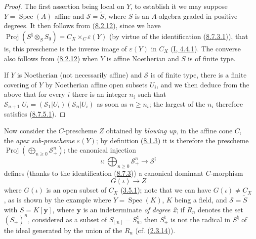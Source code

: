 \begin{proof}
The first assertion being local on $Y$, to establish it we may suppose
$Y=\operatorname{Spec}(A)$ affine and $\mathcal{S}=\widetilde{S}$, where $S$ is
an $A$-algebra graded in positive degrees. It then follows from
(\hyperref[II.8.2.12]{8.2.12}), since we have
$\operatorname{Proj}(S^{\natural}\otimes_S S_0)=
C_X\times_C\varepsilon(Y)$ (by virtue of the identification
(\hyperref[II.8.7.3.1]{8.7.3.1})), that is, this prescheme is the
inverse image of $\varepsilon(Y)$ in $C_X$
(\hyperref[I.4.4.1]{I, 4.4.1}). The converse also follows from
(\hyperref[II.8.2.12]{8.2.12}) when $Y$ is affine Noetherian and $S$ is of
finite type.

If $Y$ is Noetherian (not necessarily affine) and $\mathcal{S}$ is of finite
type, there is a finite covering of $Y$ by Noetherian affine open subsets
$U_i$, and we then deduce from the above that for every $i$ there is an
integer $n_i$ such that
$\mathcal{S}_{n+1}|U_i=(\mathcal{S}_1|U_i)(\mathcal{S}_n|U_i)$ as soon as
$n\geqslant n_i$; the largest of the $n_i$ therefore satisfies
(\hyperref[II.8.7.5.1]{8.7.5.1}).
\end{proof}

\begin{env}[8.7.6]
\label{II.8.7.6}
Now consider the $C$-prescheme $Z$ obtained by \emph{blowing up}, in the
affine cone $C$, the \emph{apex sub-prescheme} $\varepsilon(Y)$; by
definition (\hyperref[II.8.1.3]{8.1.3}) it is therefore the prescheme
$\operatorname{Proj}(\bigoplus_{n\geqslant 0}\mathcal{S}_+^n)$; the canonical
injection
\begin{equation}
\label{II.8.7.6.1}
  \iota:\bigoplus_{n\geqslant 0}\mathcal{S}_+^n
  \longrightarrow\mathcal{S}^{\natural}
\tag{8.7.6.1}
\end{equation}
defines (thanks to the identification (\hyperref[II.8.7.3]{8.7.3})) a
canonical dominant $C$-morphism
\begin{equation}
\label{II.8.7.6.2}
  G(\iota)\longrightarrow Z
\tag{8.7.6.2}
\end{equation}
where $G(\iota)$ is an open subset of $C_X$ (\hyperref[II.3.5.1]{3.5.1});
note that we can have $G(\iota)\ne C_X$, as is shown by the example where
$Y=\operatorname{Spec}(K)$, $K$ being a field, and $\mathcal{S}=\widetilde{S}$
with $S=K[\mathbf{y}]$, where $\mathbf{y}$ is an indeterminate \emph{of degree
2}; if $R_n$ denotes the set $(S_+)^n$, considered as a subset of
$S_{[n]}=S_n^{\natural}$, then $S_+^{\natural}$ is not the radical in
$S^{\natural}$ of the ideal generated by the union of the $R_n$ (cf.
(\hyperref[II.2.3.14]{2.3.14})).
\end{env}

